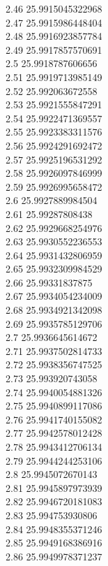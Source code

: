 {2.46	25.9915045322968\\
2.47	25.9915986448404\\
2.48	25.9916923857784\\
2.49	25.9917857570691\\
2.5	25.9918787606656\\
2.51	25.9919713985149\\
2.52	25.992063672558\\
2.53	25.9921555847291\\
2.54	25.9922471369557\\
2.55	25.9923383311576\\
2.56	25.9924291692472\\
2.57	25.9925196531292\\
2.58	25.9926097846999\\
2.59	25.9926995658472\\
2.6	25.9927889984504\\
2.61	25.99287808438\\
2.62	25.9929668254976\\
2.63	25.9930552236553\\
2.64	25.9931432806959\\
2.65	25.9932309984529\\
2.66	25.99331837875\\
2.67	25.9934054234009\\
2.68	25.9934921342098\\
2.69	25.9935785129706\\
2.7	25.9936645614672\\
2.71	25.9937502814733\\
2.72	25.9938356747525\\
2.73	25.993920743058\\
2.74	25.9940054881326\\
2.75	25.9940899117086\\
2.76	25.9941740155082\\
2.77	25.9942578012428\\
2.78	25.9943412706134\\
2.79	25.9944244253106\\
2.8	25.9945072670143\\
2.81	25.9945897973939\\
2.82	25.9946720181083\\
2.83	25.994753930806\\
2.84	25.9948355371246\\
2.85	25.9949168386916\\
2.86	25.9949978371237\\
}
